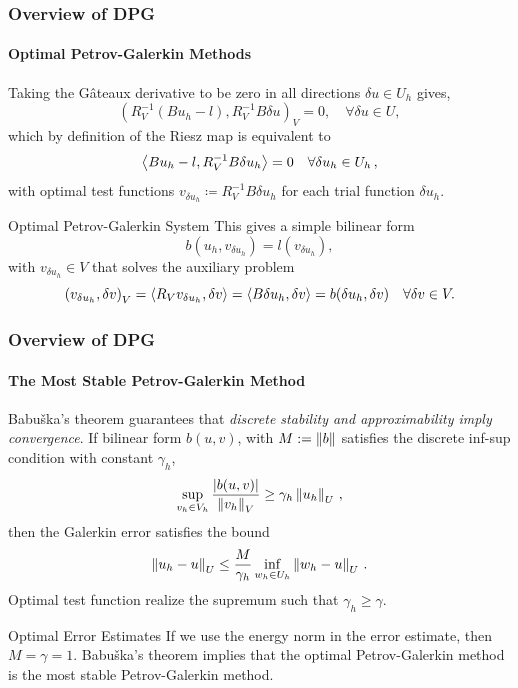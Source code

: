 \documentclass[18pt,xcolor=table]{beamer}
\begin{document}
\begin{frame}[t]
\frametitle{Overview of DPG}
\framesubtitle{Optimal Petrov-Galerkin Methods}
Taking the G\^ateaux derivative to be zero in all directions $\delta u \in
U_h$ gives,
\[
\left(R_V^{-1}(Bu_h-l),R_V^{-1}B\delta u\right)_V = 0, \quad \forall \delta u \in U,
\]
which by definition of the Riesz map is equivalent to 
\begin{equation*}
\left\langle Bu_h-l,R_V^{-1}B\delta u_h \right\rangle=0\quad\forall\delta u_h\in U_h\,,
\end{equation*}
with optimal test functions $v_{\delta u_h}\coloneqq R_V^{-1}B\delta u_h$ for each trial function $\delta u_h$.
\begin{block}{Optimal Petrov-Galerkin System}
This gives a simple bilinear form
\begin{equation*}
b(u_h,v_{\delta u_h})=l(v_{\delta u_h}),
\end{equation*}
with $v_{\delta u_h}\in V$ that solves the auxiliary problem
\begin{equation*}
\left( v_{\delta u_h},\delta v \right)_V=\left\langle R_Vv_{\delta u_h},\delta v \right\rangle
=\left\langle B\delta u_h,\delta v \right\rangle=b(\delta u_h,\delta v)\quad\forall\delta v\in V.
\end{equation*}
\end{block}
\end{frame}


\begin{frame}[t]
\frametitle{Overview of DPG}
\framesubtitle{The Most Stable Petrov-Galerkin Method}
Babu\v{s}ka's theorem guarantees that \emph{discrete stability and approximability imply convergence}.
If bilinear form $b(u,v)$, with $M:=\left\| b \right\|$ satisfies the discrete inf-sup condition 
with constant $\gamma_h$,
\[
\sup_{v_h\in V_h}\frac{|b(u,v)|}{\left\| v_h \right\|_V}\geq\gamma_h\left\| u_h \right\|_U\,,
\]
then the Galerkin error satisfies the bound
\[
\left\| u_h-u \right\|_U\leq\frac{M}{\gamma_h}\inf_{w_h\in U_h}\left\| w_h-u \right\|_U\,.
\]
Optimal test function realize the supremum such that $\gamma_h\geq\gamma$.\\
\begin{block}{Optimal Error Estimates}
If we use the energy norm in the error estimate, then $M=\gamma=1$.
Babu\v{s}ka's theorem
implies that the optimal Petrov-Galerkin method is the most stable Petrov-Galerkin method.
\end{block}
\end{frame}
\end{document}
